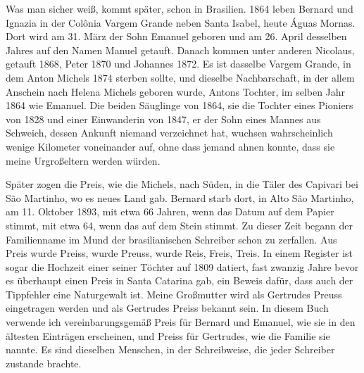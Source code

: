 \documentclass[
  ngerman,
  11pt,
  openany]{book}
\begin{document}
Was man sicher weiß, kommt später, schon in Brasilien. 1864 leben
Bernard und Ignazia in der Colônia Vargem Grande neben Santa Isabel,
heute Águas Mornas. Dort wird am 31. März der Sohn Emanuel geboren und
am 26. April desselben Jahres auf den Namen Manuel getauft. Danach
kommen unter anderen Nicolaus, getauft 1868, Peter 1870 und Johannes
1872. Es ist dasselbe Vargem Grande, in dem Anton Michels 1874 sterben
sollte, und dieselbe Nachbarschaft, in der allem Anschein nach Helena
Michels geboren wurde, Antons Tochter, im selben Jahr 1864 wie Emanuel.
Die beiden Säuglinge von 1864, sie die Tochter eines Pioniers von 1828
und einer Einwanderin von 1847, er der Sohn eines Mannes aus Schweich,
dessen Ankunft niemand verzeichnet hat, wuchsen wahrscheinlich wenige
Kilometer voneinander auf, ohne dass jemand ahnen konnte, dass sie meine
Urgroßeltern werden würden.

Später zogen die Preis, wie die Michels, nach Süden, in die Täler des
Capivari bei São Martinho, wo es neues Land gab. Bernard starb dort, in
Alto São Martinho, am 11. Oktober 1893, mit etwa 66 Jahren, wenn das
Datum auf dem Papier stimmt, mit etwa 64, wenn das auf dem Stein stimmt.
Zu dieser Zeit begann der Familienname im Mund der brasilianischen
Schreiber schon zu zerfallen. Aus Preis wurde Preiss, wurde Preuss,
wurde Reis, Freis, Treis. In einem Register ist sogar die Hochzeit einer
seiner Töchter auf 1809 datiert, fast zwanzig Jahre bevor es überhaupt
einen Preis in Santa Catarina gab, ein Beweis dafür, dass auch der
Tippfehler eine Naturgewalt ist. Meine Großmutter wird als Gertrudes
Preuss eingetragen werden und als Gertrudes Preiss bekannt sein. In
diesem Buch verwende ich vereinbarungsgemäß Preis für Bernard und
Emanuel, wie sie in den ältesten Einträgen erscheinen, und Preiss für
Gertrudes, wie die Familie sie nannte. Es sind dieselben Menschen, in
der Schreibweise, die jeder Schreiber zustande brachte.
\end{document}
